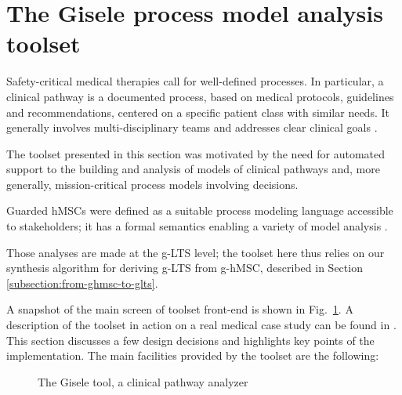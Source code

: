 \section{The Gisele process model analysis toolset\label{section:tool-clinical-pathway-analyzer}}

Safety-critical medical therapies call for well-defined processes. In particular, a clinical pathway is a documented process, based on medical protocols, guidelines and recommendations, centered on a specific patient class with similar needs. It generally involves multi-disciplinary teams and addresses clear clinical goals \cite{Middleton:2000}. 

The toolset presented in this section was motivated by the need for automated support to the building and analysis of models of clinical pathways and, more generally, mission-critical process models involving decisions. 

Guarded hMSCs were defined as a suitable process modeling language accessible to stakeholders; it has a formal semantics enabling a variety of model analysis \cite{Damas:2009, Damas:2011}. 

Those analyses are made at the g-LTS level; the toolset here thus relies on our synthesis algorithm for deriving g-LTS from g-hMSC, described in Section \ref{subsection:from-ghmsc-to-glts}.

A snapshot of the main screen of toolset front-end is shown in Fig.~\ref{image:gisele-tool}. A description of the toolset in action on a real medical case study can be found in \cite{Damas:2011}. This section discusses a few design decisions and highlights key points of the implementation. The main facilities provided by the toolset are the following:

\begin{figure}
\centering{}
  \caption{The Gisele tool, a clinical pathway analyzer\label{image:gisele-tool}}
\end{figure}

